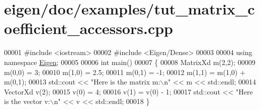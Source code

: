 \hypertarget{eigen_2doc_2examples_2tut__matrix__coefficient__accessors_8cpp_source}{}\section{eigen/doc/examples/tut\+\_\+matrix\+\_\+coefficient\+\_\+accessors.cpp}
\label{eigen_2doc_2examples_2tut__matrix__coefficient__accessors_8cpp_source}

\begin{DoxyCode}
00001 \textcolor{preprocessor}{#include <iostream>}
00002 \textcolor{preprocessor}{#include <Eigen/Dense>}
00003 
00004 \textcolor{keyword}{using namespace }\hyperlink{namespace_eigen}{Eigen};
00005 
00006 \textcolor{keywordtype}{int} main()
00007 \{
00008   MatrixXd m(2,2);
00009   m(0,0) = 3;
00010   m(1,0) = 2.5;
00011   m(0,1) = -1;
00012   m(1,1) = m(1,0) + m(0,1);
00013   std::cout << \textcolor{stringliteral}{"Here is the matrix m:\(\backslash\)n"} << m << std::endl;
00014   VectorXd v(2);
00015   v(0) = 4;
00016   v(1) = v(0) - 1;
00017   std::cout << \textcolor{stringliteral}{"Here is the vector v:\(\backslash\)n"} << v << std::endl;
00018 \}
\end{DoxyCode}
